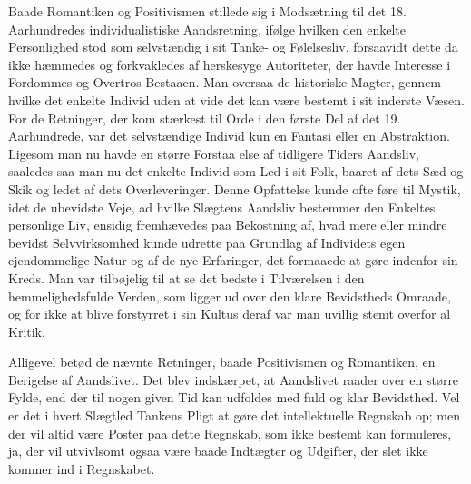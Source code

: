 \documentclass[12pt,a4paper,openany]{book}
\newcommand{\opage}[1]{\marginnote{\footnotesize\textit{[#1]}}}
\begin{document}
Baade Romantiken og Positivismen stillede sig i Modsætning til
det 18. Aarhundredes individualistiske Aandsretning, ifølge hvilken
den enkelte Personlighed stod som selvstændig i sit Tanke- og Følelsesliv,
forsaavidt dette da ikke hæmmedes og forkvakledes af herskesyge
Autoriteter, der havde Interesse i Fordommes og Overtros
Bestaaen. Man oversaa de historiske Magter, gennem hvilke det enkelte
Individ uden at vide det kan være bestemt i sit inderste Væsen.
For de Retninger, der kom stærkest til Orde i den første Del
af det 19. Aarhundrede, var det selvstændige Individ kun en Fantasi
eller en Abstraktion. Ligesom man nu havde en større Forstaa%
\opage{45}else af tidligere Tiders Aandsliv, saaledes saa man nu det enkelte
Individ som Led i sit Folk, baaret af dets Sæd og Skik og ledet af
dets Overleveringer. Denne Opfattelse kunde ofte føre til Mystik,
idet de ubevidste Veje, ad hvilke Slægtens Aandsliv bestemmer den
Enkeltes personlige Liv, ensidig fremhævedes paa Bekostning af,
hvad mere eller mindre bevidst Selvvirksomhed kunde udrette paa
Grundlag af Individets egen ejendommelige Natur og af de nye Erfaringer,
det formaaede at gøre indenfor sin Kreds. Man var tilbøjelig
til at se det bedste i Tilværelsen i den hemmelighedsfulde Verden,
som ligger ud over den klare Bevidstheds Omraade, og for ikke at
blive forstyrret i sin Kultus deraf var man uvillig stemt overfor al
Kritik.

Alligevel betød de nævnte Retninger, baade Positivismen og Romantiken,
en Berigelse af Aandslivet. Det blev indskærpet, at Aandslivet
raader over en større Fylde, end der til nogen given Tid kan
udfoldes med fuld og klar Bevidsthed. Vel er det i hvert Slægtled
Tankens Pligt at gøre det intellektuelle Regnskab op; men der vil
altid være Poster paa dette Regnskab, som ikke bestemt kan formuleres,
ja, der vil utvivlsomt ogsaa være baade Indtægter og Udgifter,
der slet ikke kommer ind i Regnskabet.
\end{document}
